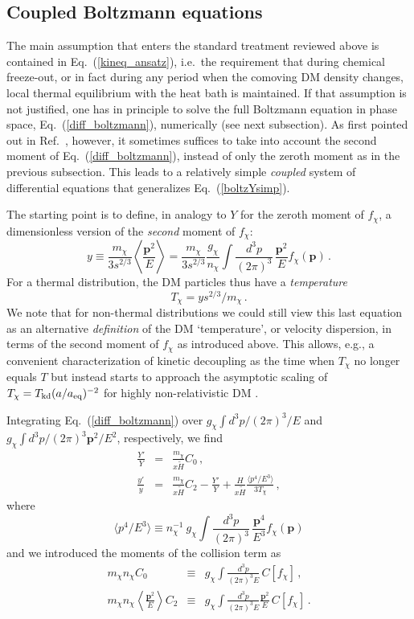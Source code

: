 \documentclass[twocolumn,showpacs,amsmath,amssymb,superscriptaddress,nofootinbib]{revtex4-1}
\newcommand{\be}{\begin{equation}}
\newcommand{\ee}{\end{equation}}
\newcommand{\bea}{\begin{eqnarray}}
\newcommand{\eea}{\end{eqnarray}}
\begin{document}
\subsection{Coupled Boltzmann equations}
\label{sec:cBE}

The main assumption that enters the standard treatment reviewed above is 
contained in Eq.~(\ref{kineq_ansatz}), i.e.~the requirement that during chemical freeze-out,
or in fact during any period when the comoving DM density changes, local thermal
equilibrium with the heat bath is maintained. If that assumption is not justified, one
has in principle to solve the full Boltzmann equation in phase space, Eq.~(\ref{diff_boltzmann}), 
numerically (see next subsection). 
As first pointed out in Ref.~\cite{vandenAarssen:2012ag}, however, it sometimes suffices
to take into account the second moment of Eq.~(\ref{diff_boltzmann}), instead of only the zeroth moment 
as in the previous subsection. This leads to a 
relatively simple {\it coupled} system of differential equations that generalizes Eq.~(\ref{boltzYsimp}).

The starting point is to define, in analogy to $Y$ for the zeroth moment of $f_\chi$, a 
dimensionless version of the {\it second} %
moment of $f_\chi$:
\be
\label{ydef}
 y\equiv \frac{m_\chi}{3 s^{2/3}}
\left\langle \frac{\mathbf{p}^2}{E} \right\rangle
=
\frac{m_\chi}{3 s^{2/3}}
\frac{g_\chi}{n_\chi}\int \frac{d^3p}{(2\pi)^3}\,\frac{\mathbf{p}^2}{E} f_\chi(\mathbf{p})\,.
\ee
For a thermal distribution, 
the DM particles thus have a {\it temperature}
\be
\label{tdef}
  T_\chi = y s^{2/3}/m_\chi\,.
\ee
We note that for non-thermal distributions we could still view this last equation as an alternative {\it definition} 
of the DM `temperature', or velocity dispersion, in terms of the second moment of $f_\chi$ as introduced above.
This allows, e.g., a convenient characterization 
of kinetic decoupling as the time when $T_\chi$ %
no longer equals $T$ but instead
starts to approach the asymptotic scaling of $T_\chi=T_{\rm kd} (a/a_{\rm eq})^{-2}$ for highly non-relativistic DM 
\cite{Bringmann:2006mu,Bringmann:2009vf}.

Integrating Eq.~(\ref{diff_boltzmann}) over $g_\chi\int d^3p/(2\pi)^3/E$ and $g_\chi\int d^3p/(2\pi)^3\mathbf{p}^2/E^2$,
respectively, we find %
\bea
\frac{Y'}{Y} &=& \frac{m_\chi}{x \tilde H}C_0\,, \label{Yfinal}\\
\frac{y'}{y} &=& \frac{m_\chi }{x \tilde H} C_2 - \frac{Y'}{Y} 
+\frac{H}{x\tilde H}
\frac{\langle p^4/E^3 \rangle}{3T_\chi}\,,\label{yfinal}
\eea
where
\be
\langle p^4/E^3 \rangle \equiv n_\chi^{-1}~ g_\chi \int \frac{d^3p}{(2\pi)^3}\,\frac{\mathbf{p}^4}{E^3} f_\chi(\mathbf{p})
\label{p4E3def}
\ee
and we introduced the moments of the collision term as
\bea
m_\chi n_\chi C_0&\equiv&  g_\chi \int \frac{d^3p}{(2\pi)^3E}\, C[f_\chi]\,,\\
m_\chi n_\chi \left\langle \frac{\mathbf{p}^2}{E} \right\rangle C_2&\equiv&  g_\chi \int \frac{d^3p}{(2\pi)^3E} \frac{\mathbf{p}^2}{E}\, C[f_\chi]\,.
\eea
\end{document}
